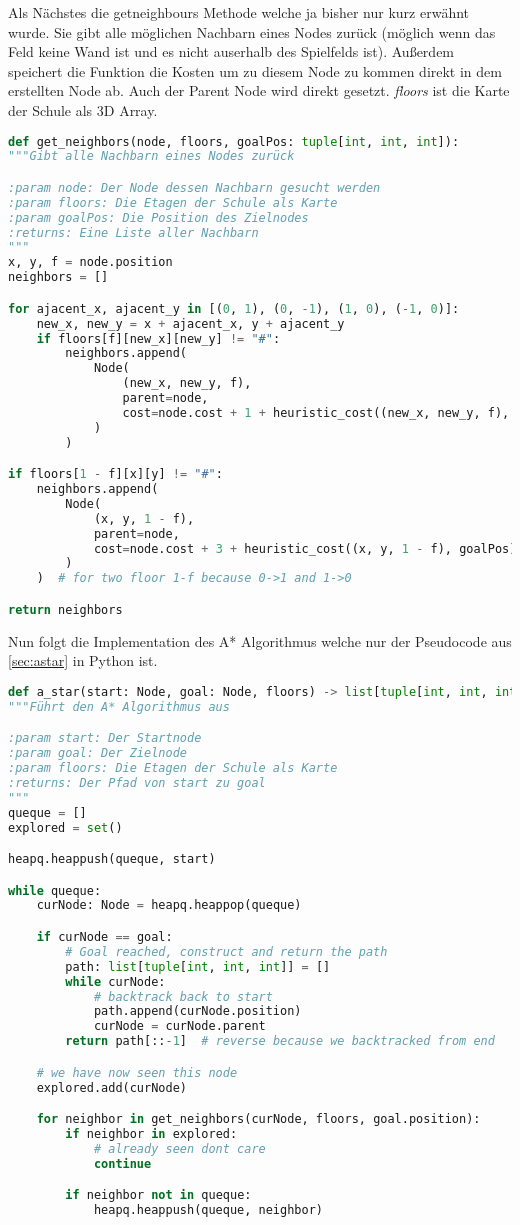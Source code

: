 \documentclass[a4paper,10pt,ngerman]{scrartcl}
\begin{document}
Als Nächstes die get\textunderscore neighbours Methode welche ja bisher nur kurz erwähnt wurde.
Sie gibt alle möglichen Nachbarn eines Nodes zurück (möglich wenn das Feld keine Wand ist und es nicht auserhalb des Spielfelds ist).
Außerdem speichert die Funktion die Kosten um zu diesem Node zu kommen direkt in dem erstellten Node ab.
Auch der Parent Node wird direkt gesetzt. \emph{floors} ist die Karte der Schule als 3D Array.
\begin{lstlisting}[language=Python]
def get_neighbors(node, floors, goalPos: tuple[int, int, int]):
"""Gibt alle Nachbarn eines Nodes zurück

:param node: Der Node dessen Nachbarn gesucht werden
:param floors: Die Etagen der Schule als Karte
:param goalPos: Die Position des Zielnodes
:returns: Eine Liste aller Nachbarn
"""
x, y, f = node.position
neighbors = []

for ajacent_x, ajacent_y in [(0, 1), (0, -1), (1, 0), (-1, 0)]:
    new_x, new_y = x + ajacent_x, y + ajacent_y
    if floors[f][new_x][new_y] != "#":
        neighbors.append(
            Node(
                (new_x, new_y, f),
                parent=node,
                cost=node.cost + 1 + heuristic_cost((new_x, new_y, f), goalPos),
            )
        )

if floors[1 - f][x][y] != "#":
    neighbors.append(
        Node(
            (x, y, 1 - f),
            parent=node,
            cost=node.cost + 3 + heuristic_cost((x, y, 1 - f), goalPos),
        )
    )  # for two floor 1-f because 0->1 and 1->0

return neighbors
\end{lstlisting}
Nun folgt die Implementation des A* Algorithmus welche nur der Pseudocode aus \cref{sec:astar} in Python ist.
\begin{lstlisting}[language=Python]
def a_star(start: Node, goal: Node, floors) -> list[tuple[int, int, int]]:
"""Führt den A* Algorithmus aus

:param start: Der Startnode
:param goal: Der Zielnode
:param floors: Die Etagen der Schule als Karte
:returns: Der Pfad von start zu goal
"""
queque = []
explored = set()

heapq.heappush(queque, start)

while queque:
    curNode: Node = heapq.heappop(queque)

    if curNode == goal:
        # Goal reached, construct and return the path
        path: list[tuple[int, int, int]] = []
        while curNode:
            # backtrack back to start
            path.append(curNode.position)
            curNode = curNode.parent
        return path[::-1]  # reverse because we backtracked from end

    # we have now seen this node
    explored.add(curNode)

    for neighbor in get_neighbors(curNode, floors, goal.position):
        if neighbor in explored:
            # already seen dont care
            continue

        if neighbor not in queque:
            heapq.heappush(queque, neighbor)
\end{lstlisting}
\end{document}
